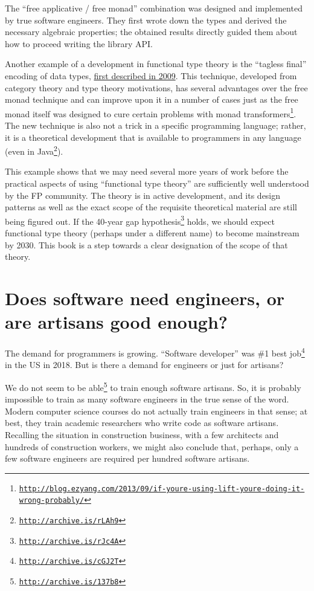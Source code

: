 The ``free applicative / free monad'' combination was designed and
implemented by true software engineers. They first wrote down the
types and derived the necessary algebraic properties; the obtained
results directly guided them about how to proceed writing the library
API.

Another example of a development in functional type theory is the
 ``tagless final'' encoding of data types, \href{http://okmij.org/ftp/tagless-final/index.html}{first described in 2009}.
This technique, developed from category theory and type theory motivations,
has several advantages over the free monad technique and can improve
upon it in a number of cases \textemdash{} just as the free monad
itself was designed to cure certain problems with monad transformers\footnote{\texttt{\href{http://blog.ezyang.com/2013/09/if-youre-using-lift-youre-doing-it-wrong-probably/}{http://blog.ezyang.com/2013/09/if-youre-using-lift-youre-doing-it-wrong-probably/}}}.
The new technique is also not a trick in a specific programming language;
rather, it is a theoretical development that is available to programmers
in any language (even in Java\footnote{\texttt{\href{http://archive.is/rLAh9}{http://archive.is/rLAh9}}}).

This example shows that we may need several more years of work before
the practical aspects of using ``functional type theory'' are sufficiently
well understood by the FP community. The theory is in active development,
and its design patterns \textemdash{} as well as the exact scope of
the requisite theoretical material \textemdash{} are still being figured
out. If the 40-year gap hypothesis\footnote{\texttt{\href{http://archive.is/rJc4A}{http://archive.is/rJc4A}}}
holds, we should expect functional type theory (perhaps under a different
name) to become mainstream by 2030. This book is a step towards a
clear designation of the scope of that theory.

\section{Does software need engineers, or are artisans good enough? }

The demand for programmers is growing. ``Software developer'' was
\#1 best job\footnote{\texttt{\href{http://archive.is/cGJ2T}{http://archive.is/cGJ2T}}}
in the US in 2018. But is there a demand for engineers or just for
artisans?

We do not seem to be able\footnote{\texttt{\href{http://archive.is/137b8}{http://archive.is/137b8}}}
to train enough software artisans. So, it is probably impossible to
train as many software engineers in the true sense of the word. Modern
computer science courses do not actually train engineers in that sense;
at best, they train academic researchers who write code as software
artisans. Recalling the situation in construction business, with a
few architects and hundreds of construction workers, we might also
conclude that, perhaps, only a few software engineers are required
per hundred software artisans.

